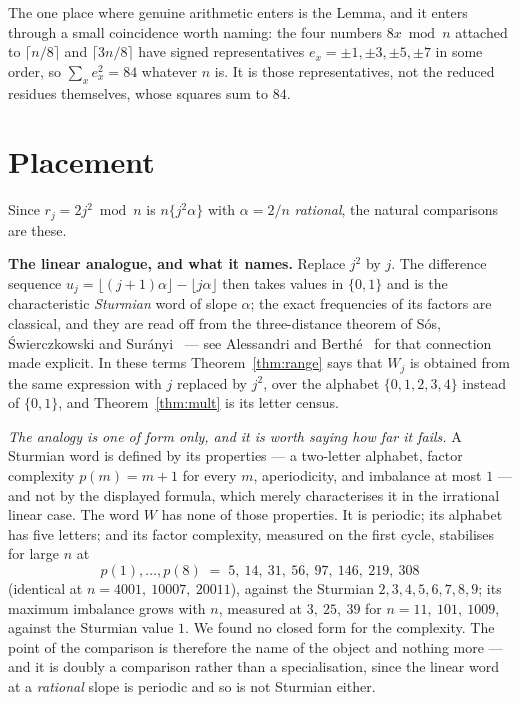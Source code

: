 \documentclass[11pt,reqno]{amsart}
\theoremstyle{plain}
\theoremstyle{remark}
\numberwithin{equation}{section}
\begin{document}
The one place where genuine arithmetic enters is the Lemma, and it enters
through a small coincidence worth naming: the four numbers $8x \bmod n$ attached
to $\lceil n/8\rceil$ and $\lceil 3n/8\rceil$ have signed representatives
$e_x = \pm1,\pm3,\pm5,\pm7$ in some order, so $\sum_x e_x^2 = 84$ whatever $n$
is. It is those representatives, not the reduced residues themselves, whose
squares sum to $84$.

\section{Placement}

Since $r_j = 2j^2 \bmod n$ is $n\{j^2\alpha\}$ with $\alpha = 2/n$
\emph{rational}, the natural comparisons are these.

\medskip\noindent
\textbf{The linear analogue, and what it names.} Replace $j^2$ by $j$. The
difference sequence $u_j = \lfloor (j+1)\alpha\rfloor - \lfloor j\alpha\rfloor$
then takes values in $\{0,1\}$ and is the characteristic \emph{Sturmian} word of
slope $\alpha$; the exact frequencies of its factors are classical, and they are
read off from the three-distance theorem of S\'os, \'Swierczkowski and
Sur\'anyi~\cite{sos} --- see Alessandri and Berth\'e~\cite{ab} for that
connection made explicit. In these terms Theorem~\ref{thm:range} says that $W_j$
is obtained from the same expression with $j$ replaced by $j^2$, over the
alphabet $\{0,1,2,3,4\}$ instead of $\{0,1\}$, and Theorem~\ref{thm:mult} is
its letter census.

\emph{The analogy is one of form only, and it is worth saying how far it fails.}
A Sturmian word is defined by its properties --- a two-letter alphabet, factor
complexity $p(m) = m+1$ for every $m$, aperiodicity, and imbalance at most $1$
--- and not by the displayed formula, which merely characterises it in the
irrational linear case. The word $W$ has none of those properties. It is
periodic; its alphabet has five letters; and its factor complexity, measured on
the first cycle, stabilises for large $n$ at
\[
  p(1),\dots,p(8) \;=\; 5,\ 14,\ 31,\ 56,\ 97,\ 146,\ 219,\ 308
\]
(identical at $n = 4001,\ 10007,\ 20011$), against the Sturmian
$2,3,4,5,6,7,8,9$; its maximum imbalance grows with $n$, measured at
$3,\ 25,\ 39$ for $n = 11,\ 101,\ 1009$, against the Sturmian value $1$. We
found no closed form for the complexity. The point of the comparison is
therefore the name of the object and nothing more --- and it is doubly a
comparison rather than a specialisation, since the linear word at a
\emph{rational} slope is periodic and so is not Sturmian either.
\end{document}
